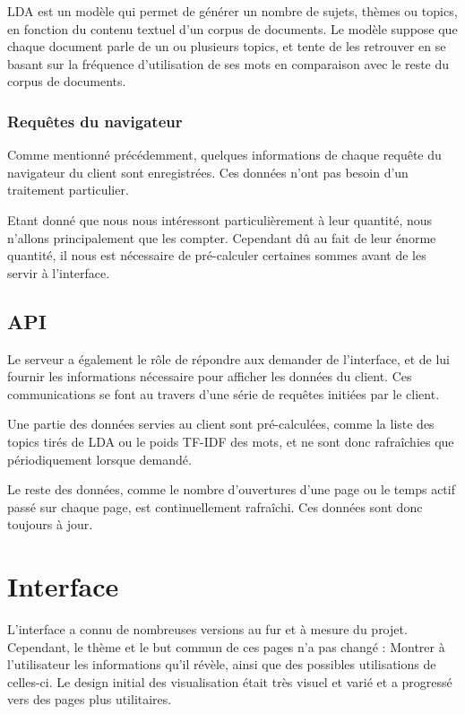 				LDA est un modèle qui permet de générer un nombre de sujets, thèmes ou topics, en fonction du contenu textuel d'un corpus de documents. Le modèle suppose que chaque document parle de un ou plusieurs topics, et tente de les retrouver en se basant sur la fréquence d'utilisation de ses mots en comparaison avec le reste du corpus de documents. 

		\subsubsection{Requêtes du navigateur}

			Comme mentionné précédemment, quelques informations de chaque requête du navigateur du client sont enregistrées. Ces données n'ont pas besoin d'un traitement particulier.

			Etant donné que nous nous intéressont particulièrement à leur quantité, nous n'allons principalement que les compter. Cependant dû au fait de leur énorme quantité, il nous est nécessaire de pré-calculer certaines sommes avant de les servir à l'interface.

	\subsection{API}

		Le serveur a également le rôle de répondre aux demander de l'interface, et de lui fournir les informations nécessaire pour afficher les données du client. Ces communications se font au travers d'une série de requêtes initiées par le client.

		Une partie des données servies au client sont pré-calculées, comme la liste des topics tirés de LDA ou le poids TF-IDF des mots, et ne sont donc rafraîchies que périodiquement lorsque demandé.

		Le reste des données, comme le nombre d'ouvertures d'une page ou le temps actif passé sur chaque page, est continuellement rafraîchi. Ces données sont donc toujours à jour.

\section{Interface}

	L'interface a connu de nombreuses versions au fur et à mesure du projet. Cependant, le thème et le but commun de ces pages n'a pas changé : Montrer à l'utilisateur les informations qu'il révèle, ainsi que des possibles utilisations de celles-ci. Le design initial des visualisation était très visuel et varié et a progressé vers des pages plus utilitaires.


